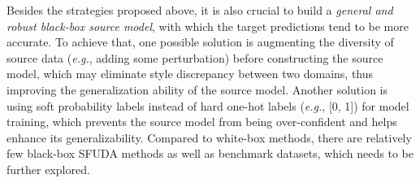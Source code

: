 \documentclass[10pt,journal,compsoc]{IEEEtran}
\def\eg{{\em e.g.}}
\begin{document}
Besides the strategies proposed above, it is also crucial to build a \emph{general and robust black-box source model}, with which the target predictions tend to be more accurate.
To achieve that, one possible solution is augmenting the diversity of source data (\eg, adding some perturbation) before constructing the source model, which may eliminate style discrepancy between two domains, thus improving the generalization ability of the source model.
Another solution is using soft probability labels instead of hard one-hot labels (\eg, [0, 1]) for model training, which prevents the source model from being over-confident and helps enhance its generalizability. 
Compared to white-box methods, there are relatively few black-box SFUDA methods as well as benchmark datasets, which needs to be further explored. 




\end{document}
